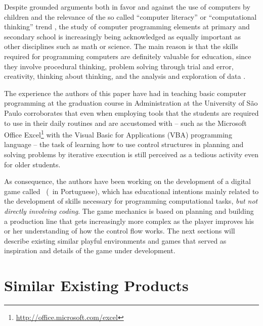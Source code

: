 \documentclass{sigchi}
\begin{document}
    Despite grounded arguments both in favor and against the use of computers by
    children \cite{Istrate2010,Setzer2001} and the relevance of the so called
    ``computer literacy'' or ``computational thinking'' trend
    \cite{Wing2006,Atwood2012}, the study of computer programming elements at
    primary and secondary school is increasingly being acknowledged as equally
    important as other disciplines such as math or science. The main reason is
    that the skills required for programming computers are definitely valuable
    for education, since they involve procedural thinking, problem solving
    through trial and error, creativity, thinking about thinking, and the
    analysis and exploration of data \cite{Kahn1999}.

    The experience the authors of this paper have had in teaching basic computer
    programming at the graduation course in Administration at the University of
    S\~ao Paulo corroborates that even when employing tools that the students
    are required to use in their daily routines and are accustomed with -- such
    as the Microsoft Office
    Excel\footnote{\url{http://office.microsoft.com/excel}} with the Visual
    Basic for Applications (VBA) programming language -- the task of learning
    how to use control structures in planning and solving problems by iterative
    execution is still perceived as a tedious activity even for older students.

    As consequence, the authors have been working on the development of a
    digital game called \gamename~(\gamenamept~in Portuguese), which has
    educational intentions mainly related to the development of skills necessary
    for programming computational tasks, \textit{but not directly involving
    coding}. The game mechanics is based on planning and building a production
    line that gets increasingly more complex as the player improves his or her
    understanding of how the control flow works. The next sections will describe
    existing similar playful environments and games that served as inspiration
    and details of the game under development.

\section{Similar Existing Products}
\end{document}

